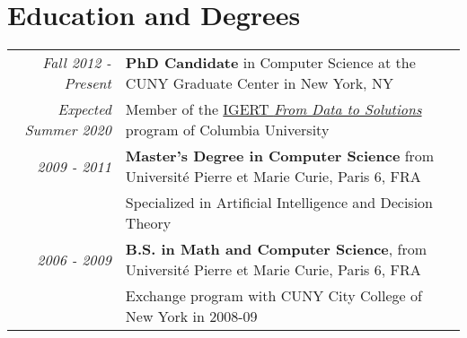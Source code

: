 \documentclass[a4paper,10pt]{article}
\begin{document}
\section{Education and Degrees}
    \vspace{0.2cm}
    \begin{tabular}{rp{14cm}} 
        \hspace{0.35cm} \emph{Fall 2012 - Present} & \textbf{PhD Candidate} in Computer Science at the CUNY Graduate Center in New York, NY\\
        {\small \em Expected Summer 2020} & Member of the \href{http://www.cs.columbia.edu/igert/people_students.shtml}{IGERT {\em From Data to Solutions}} program of Columbia University
        \vspace{0.15cm} \\

        \emph{2009 - 2011} & {\bfseries Master's Degree in Computer Science} from Université Pierre et Marie Curie, Paris 6, FRA \\
        & Specialized in Artificial Intelligence and Decision Theory
        \vspace{0.15cm} \\

         
        \emph{2006 - 2009} & {\bfseries B.S. in Math and Computer Science}, from Université Pierre et Marie Curie, Paris 6, FRA \\ 
        & Exchange program with CUNY City College of New York in 2008-09
        \vspace{0.15cm} \\
         
         

    \end{tabular}
\end{document}
